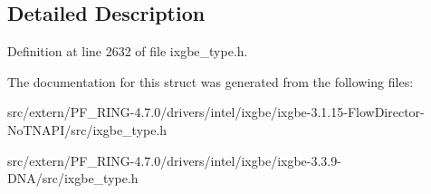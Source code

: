 \subsection{Detailed Description}


Definition at line 2632 of file ixgbe\_\-type.h.



The documentation for this struct was generated from the following files:\begin{DoxyCompactItemize}
\item 
src/extern/PF\_\-RING-\/4.7.0/drivers/intel/ixgbe/ixgbe-\/3.1.15-\/FlowDirector-\/NoTNAPI/src/ixgbe\_\-type.h\item 
src/extern/PF\_\-RING-\/4.7.0/drivers/intel/ixgbe/ixgbe-\/3.3.9-\/DNA/src/ixgbe\_\-type.h\end{DoxyCompactItemize}
